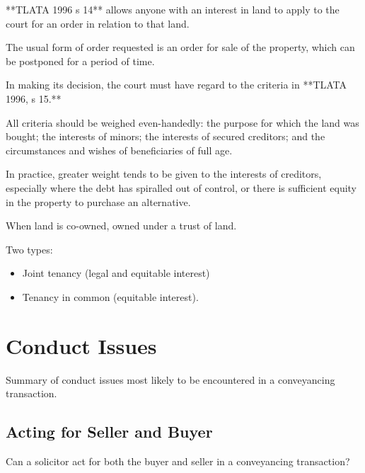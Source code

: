 \documentclass[
]{article}
\newenvironment{Shaded}{}{}
\newcommand{\NormalTok}[1]{#1}
\providecommand{\tightlist}{%
  \setlength{\itemsep}{0pt}\setlength{\parskip}{0pt}}
\begin{document}
\begin{Shaded}
\begin{Highlighting}[]
\NormalTok{**TLATA 1996 s 14** allows anyone with an interest in land to apply to the court for an order in relation to that land.}

\NormalTok{The usual form of order requested is an order for sale of the property, which can be postponed for a period of time.}

\NormalTok{In making its decision, the court must have regard to the criteria in **TLATA 1996, s 15.**}

\NormalTok{All criteria should be weighed even{-}handedly: the purpose for which the land was bought; the interests of minors; the interests of secured creditors; and the circumstances and wishes of beneficiaries of full age.}

\NormalTok{In practice, greater weight tends to be given to the interests of creditors, especially where the debt has spiralled out of control, or there is sufficient equity in the property to purchase an alternative.}
\end{Highlighting}
\end{Shaded}

When land is co-owned, owned under a trust of land.

Two types:

\begin{itemize}
\tightlist
\item
  Joint tenancy (legal and equitable interest)
\item
  Tenancy in common (equitable interest).
\end{itemize}

\hypertarget{conduct-issues}{%
\section{Conduct Issues}\label{conduct-issues}}

Summary of conduct issues most likely to be encountered in a
conveyancing transaction.

\hypertarget{acting-for-seller-and-buyer}{%
\subsection{Acting for Seller and
Buyer}\label{acting-for-seller-and-buyer}}

\begin{Shaded}
\begin{Highlighting}[]
\NormalTok{Can a solicitor act for both the buyer and seller in a conveyancing transaction?}
\end{Highlighting}
\end{Shaded}
\end{document}

